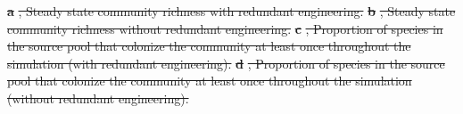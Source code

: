 \documentclass[twocolumn,preprintnumbers,amsmath,amssymb,superscriptaddress,linenumbers]{revtex4-1}
\providecommand{\DIFdel}[1]{{\protect\color{red}\sout{#1}}}                      %
\providecommand{\DIFdelend}{} %
\providecommand{\DIFdelFL}[1]{\DIFdel{#1}} %
\DeclareRobustCommand{\DIFdelend}{\DIFOaddend \let\includegraphics\DIFOincludegraphics} %
\begin{document}
{%
\textbf{\DIFdelFL{a}}%
\DIFdelFL{, Steady state community richness with redundant engineering.
}\textbf{\DIFdelFL{b}}%
\DIFdelFL{, Steady state community richness without redundant engineering.
}\textbf{\DIFdelFL{c}}%
\DIFdelFL{, Proportion of species in the source pool that colonize the community at least once throughout the simulation (with redundant engineering).
}\textbf{\DIFdelFL{d}}%
\DIFdelFL{, Proportion of species in the source pool that colonize the community at least once throughout the simulation (without redundant engineering).
}}
\DIFdelend 
\end{document}
